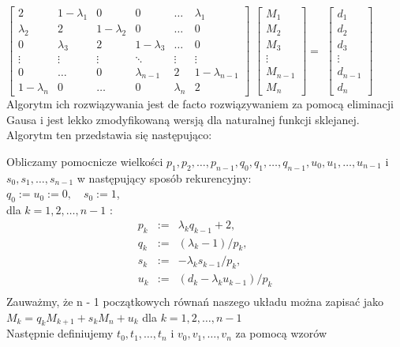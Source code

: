 \documentclass{article}
\begin{document}
$
\begin{bmatrix} 
2&1-\lambda_1&0&0&\ldots&\lambda_1\\ 
\lambda_2&2&1-\lambda_2&0&\ldots&0\\ 
0&\lambda_3&2&1-\lambda_3&\ldots&0\\ 
\vdots & \vdots&\vdots&\ddots&\vdots&\vdots\\
0&\ldots&0&\lambda_{n-1}&2&1-\lambda_{n-1}\\
1-\lambda_n&0&\ldots&0  & \lambda_n&2 
\end{bmatrix}
$
$ \begin{bmatrix} 
M_1\\
M_2\\
M_3\\
\vdots \\
M_{n-1}\\
M_n
\end{bmatrix}
=$
$ \begin{bmatrix} 
d_1\\
d_2\\
d_3\\
\vdots \\
d_{n-1}\\
d_n
\end{bmatrix}
$\\

Algorytm ich rozwiązywania jest de facto rozwiązywaniem za pomocą eliminacji Gausa i jest lekko zmodyfikowaną wersją dla naturalnej funkcji sklejanej.
Algorytm ten przedstawia się następująco:

Obliczamy pomocnicze wielkości $p_1 , p_2 , \ldots , p_{n-1} , q_0 , q_1 , \ldots , q_{n-1} , u_0 , u_1 , \ldots , u_{n-1}
$ i $s_0 , s_1 , \ldots , s_{n-1} $ w następujący sposób rekurencyjny:\\

$q_0 := u_0 := 0,\quad s_0 := 1$,\\
dla $k=1,2,\ldots,n-1$ :
\begin{eqnarray*}
p_k &:=& \lambda_k q_{k-1} + 2,\\
q_k &:=& (\lambda_k - 1)/p_k ,\\
s_k &:=& -\lambda_k s_{k-1} /p_k ,\\
u_k &:=& (d_k - \lambda_k u_{k-1} )/p_k\\
\end{eqnarray*}
Zauważmy, że n - 1 początkowych równań naszego układu można zapisać jako
$M_k = q_k M_{k+1} + s_k M_n + u_k$
dla
$k = 1, 2, \ldots , n-1$
\\
Następnie definiujemy $t_0 , t_1 , \ldots , t_n$ i $v_0 , v_1 , \ldots , v_n$ za pomocą wzorów\\
\end{document}
